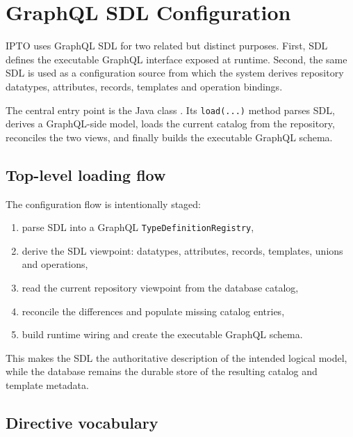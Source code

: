 \section{GraphQL SDL Configuration}
\label{sec:GraphqlSDL}

IPTO uses GraphQL SDL for two related but distinct purposes. First, SDL defines the executable GraphQL interface exposed at runtime. Second, the same SDL is used as a configuration source from which the system derives repository datatypes, attributes, records, templates and operation bindings.

The central entry point is the Java class . Its \texttt{load(...)} method parses SDL, derives a GraphQL-side model, loads the current catalog from the repository, reconciles the two views, and finally builds the executable GraphQL schema.

\subsection{Top-level loading flow}

The configuration flow is intentionally staged:
\begin{enumerate}
\item parse SDL into a GraphQL \texttt{TypeDefinitionRegistry},
\item derive the SDL viewpoint: datatypes, attributes, records, templates, unions and operations,
\item read the current repository viewpoint from the database catalog,
\item reconcile the differences and populate missing catalog entries,
\item build runtime wiring and create the executable GraphQL schema.
\end{enumerate}

This makes the SDL the authoritative description of the intended logical model, while the database remains the durable store of the resulting catalog and template metadata.

\subsection{Directive vocabulary}

